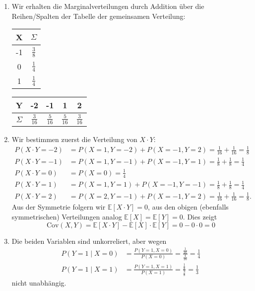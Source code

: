 \documentclass[a4paper]{article}
\begin{document}
\begin{enumerate}
    \item Wir erhalten die Marginalverteilungen durch Addition über die Reihen/Spalten der Tabelle der gemeinsamen Verteilung:
    \begin{center}
        \begin{tabular}{|c|c|}
            \hline
            X & $\Sigma$ \\ \hline
            -1 & $\frac{3}{8}$ \\ \hline
            0 & $\frac{1}{4}$ \\ \hline
            1 & $\frac{1}{4}$ \\ \hline            
        \end{tabular}\qquad
        \begin{tabular}{|c|c|c|c|c|}
            \hline
            Y & -2 & -1 & 1 & 2 \\ \hline
            $\Sigma$ & $\frac{3}{16}$ & $\frac{5}{16}$ & $\frac{5}{16}$ & $\frac{3}{16}$ \\ \hline
        \end{tabular}
    \end{center}
    \item Wir bestimmen zuerst die Verteilung von $X \cdot Y$:
    \begin{align*}
        P(X \cdot Y = -2) &= P(X = 1, Y = -2) + P(X = -1, Y = 2) = \frac{1}{16} + \frac{1}{16} = \frac{1}{8}\\
        P(X \cdot Y = -1) &= P(X = 1, Y = -1) + P(X = -1, Y = 1) = \frac{1}{8} + \frac{1}{8} = \frac{1}{4}\\
        P(X \cdot Y = 0) &= P(X = 0) = \frac{1}{4}\\
        P(X \cdot Y = 1) &= P(X = 1, Y = 1) + P(X = -1, Y = -1) = \frac{1}{8} + \frac{1}{8} = \frac{1}{4}\\
        P(X \cdot Y = 2) &= P(X = 2, Y = -1) + P(X = -1, Y = 2) = \frac{1}{16} + \frac{1}{16} = \frac{1}{8}\text{.}
    \end{align*}
    Aus der Symmetrie folgern wir $\mathds{E}[X\cdot Y] = 0$, aus den obigen (ebenfalls symmetrischen) Verteilungen analog $\mathds{E}[X] = \mathds{E}[Y] = 0$. Dies zeigt
    \begin{equation*}
        \mathrm{Cov}(X,Y) = \mathds{E}[X \cdot Y] - \mathds{E}[X] \cdot \mathds{E}[Y] = 0 - 0 \cdot 0 = 0 
    \end{equation*}
    \item Die beiden Variablen sind unkorreliert, aber wegen 
    \begin{align*}
        P(Y = 1 \mid X = 0) &= \frac{P(Y = 1, X = 0)}{P(X = 0)} = \frac{\frac
        {1}{16}}{\frac{4}{16}} = \frac{1}{4}\\
        P(Y = 1 \mid X = 1) &= \frac{P(Y = 1, X = 1)}{P(X=1)} = \frac{\frac{1}{8}}{\frac{3}{8}} = \frac{1}{3} 
    \end{align*} nicht unabhängig.
\end{enumerate}
\end{document}
